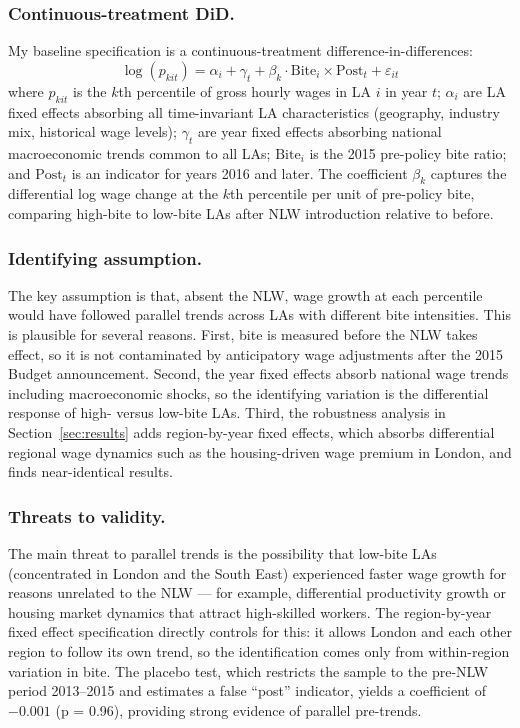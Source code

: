 \documentclass[12pt]{article}
\begin{document}
\subsubsection*{Continuous-treatment DiD.}
My baseline specification is a continuous-treatment difference-in-differences:
\begin{equation}
\log(p_{kit}) = \alpha_i + \gamma_t + \beta_k \cdot \text{Bite}_i \times \text{Post}_t + \varepsilon_{it}
\label{eq:main}
\end{equation}
where $p_{kit}$ is the $k$th percentile of gross hourly wages in LA $i$ in year $t$; $\alpha_i$ are LA fixed effects absorbing all time-invariant LA characteristics (geography, industry mix, historical wage levels); $\gamma_t$ are year fixed effects absorbing national macroeconomic trends common to all LAs; $\text{Bite}_i$ is the 2015 pre-policy bite ratio; and $\text{Post}_t$ is an indicator for years 2016 and later. The coefficient $\beta_k$ captures the differential log wage change at the $k$th percentile per unit of pre-policy bite, comparing high-bite to low-bite LAs after NLW introduction relative to before.

\subsubsection*{Identifying assumption.}
The key assumption is that, absent the NLW, wage growth at each percentile would have followed parallel trends across LAs with different bite intensities. This is plausible for several reasons. First, bite is measured before the NLW takes effect, so it is not contaminated by anticipatory wage adjustments after the 2015 Budget announcement. Second, the year fixed effects absorb national wage trends including macroeconomic shocks, so the identifying variation is the differential response of high- versus low-bite LAs. Third, the robustness analysis in Section~\ref{sec:results} adds region-by-year fixed effects, which absorbs differential regional wage dynamics such as the housing-driven wage premium in London, and finds near-identical results.

\subsubsection*{Threats to validity.}
The main threat to parallel trends is the possibility that low-bite LAs (concentrated in London and the South East) experienced faster wage growth for reasons unrelated to the NLW --- for example, differential productivity growth or housing market dynamics that attract high-skilled workers. The region-by-year fixed effect specification directly controls for this: it allows London and each other region to follow its own trend, so the identification comes only from within-region variation in bite. The placebo test, which restricts the sample to the pre-NLW period 2013--2015 and estimates a false ``post'' indicator, yields a coefficient of $-0.001$ (p = 0.96), providing strong evidence of parallel pre-trends.
\end{document}
